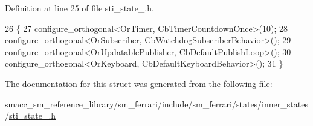 Definition at line 25 of file sti\+\_\+state\+\_.\+h.


\begin{DoxyCode}
26   \{
27     configure\_orthogonal<OrTimer, CbTimerCountdownOnce>(10);
28     configure\_orthogonal<OrSubscriber, CbWatchdogSubscriberBehavior>();
29     configure\_orthogonal<OrUpdatablePublisher, CbDefaultPublishLoop>();
30     configure\_orthogonal<OrKeyboard, CbDefaultKeyboardBehavior>();
31   \}
\end{DoxyCode}


The documentation for this struct was generated from the following file\+:\begin{DoxyCompactItemize}
\item 
smacc\+\_\+sm\+\_\+reference\+\_\+library/sm\+\_\+ferrari/include/sm\+\_\+ferrari/states/inner\+\_\+states/\hyperlink{sm__ferrari_2include_2sm__ferrari_2states_2inner__states_2sti__state__2_8h}{sti\+\_\+state\+\_.\+h}\end{DoxyCompactItemize}
